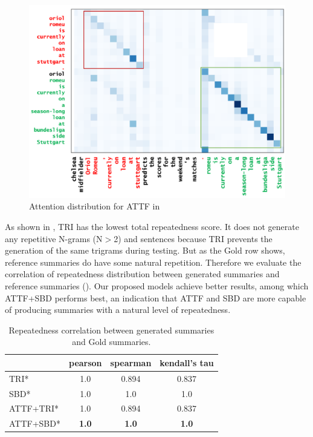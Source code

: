 \begin{figure}[th!]
\centering
\includegraphics[width=0.8\linewidth]{map3}
\caption{Attention distribution for ATTF in }
\label{fig:attn_map3}
\end{figure}


As shown in , TRI has the lowest total repeatedness score.
It does not generate any repetitive N-grams (N$>$2) and sentences 
because TRI prevents the generation of the same trigrams during testing.
But as the Gold row shows, reference summaries do have some natural repetition.
Therefore we evaluate the correlation of repeatedness distribution between
generated summaries and reference summaries ().
Our proposed models achieve better results, among which ATTF+SBD performs best, an indication that ATTF and SBD are more capable of producing summaries with a natural level of repeatedness.

\begin{table}[th]
	\centering
	\scriptsize
	\begin{tabular}{|l|c|c|c|}
		\hline
		     & pearson  & spearman & kendall's tau \\
		\hline
		TRI* & 1.0 & 0.894 & 0.837  \\
		SBD* & 1.0 & 1.0 & 1.0 \\
		ATTF+TRI* & 1.0 & 0.894 & 0.837 \\
		ATTF+SBD* & \bf 1.0 & \bf 1.0 & \bf 1.0 \\
		\hline
	\end{tabular}
    \caption{Repeatedness correlation between generated summaries and Gold summaries.}
	\label{tab:eval_repcor}
\end{table}
	
